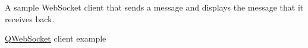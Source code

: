 A sample Web\+Socket client that sends a message and displays the message that it receives back.

\mbox{\hyperlink{class_q_web_socket}{Q\+Web\+Socket}} client example 